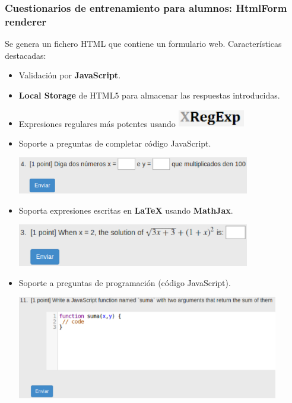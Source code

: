 \documentclass{beamer}
\begin{document}
\begin{frame}[allowframebreaks]
\frametitle{Cuestionarios de entrenamiento para alumnos: HtmlForm renderer}
  Se genera un fichero HTML que contiene un formulario web. Características destacadas:
  \begin{itemize}
    \item Validación por {\bfseries JavaScript}.
    \item {\bfseries Local Storage} de HTML5 para almacenar las respuestas introducidas.
    \item Expresiones regulares más potentes usando \includegraphics[width=0.23\textwidth]{img/xregexp.eps}
    \framebreak
    
    \item Soporte a preguntas de completar código JavaScript.
    \bigskip
    \begin{center}
      \includegraphics[width=0.8\textwidth]{img/fi_p.eps}
    \end{center}
    \bigskip
    
    \item Soporta expresiones escritas en {\bfseries LaTeX} usando {\bfseries MathJax}.
    \bigskip
    \begin{center}
      \includegraphics[width=0.8\textwidth]{img/latex.eps}
    \end{center}
    \framebreak
    
    \item Soporte a preguntas de programación (código JavaScript).
    \bigskip
    \begin{center}
      \includegraphics[width=0.9\textwidth]{img/programming.eps}
    \end{center}
    \framebreak
    

\end{itemize}
\end{frame}
\end{document}
